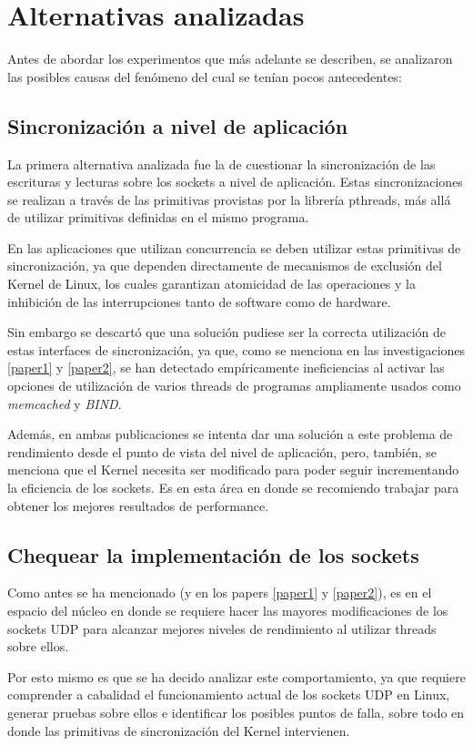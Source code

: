 \documentclass[12pt,spanish,letterpaper]{article}
\begin{document}
\section{Alternativas analizadas}
\par Antes de abordar los experimentos que más adelante se describen, se analizaron las posibles causas del fenómeno del cual se tenían pocos antecedentes:
\subsection{Sincronización a nivel de aplicación}
\par La primera alternativa analizada fue la de cuestionar la sincronización de las escrituras y lecturas sobre los sockets a nivel de aplicación. Estas sincronizaciones se realizan a través de las primitivas provistas por la librería pthreads, más allá de utilizar primitivas definidas en el mismo programa.
\par En las aplicaciones que utilizan concurrencia se deben utilizar estas primitivas de sincronización, ya que dependen directamente de mecanismos de exclusión del Kernel de Linux, los cuales garantizan atomicidad de las operaciones y la inhibición de las interrupciones tanto de software como de hardware.
\par Sin embargo se descartó que una solución pudiese ser la correcta utilización de estas interfaces de sincronización, ya que, como se menciona en las investigaciones \ref{paper1} y \ref{paper2}, se han detectado empíricamente ineficiencias al activar las opciones de utilización de varios threads de programas ampliamente usados como \emph{memcached} y \emph{BIND}.
\par Además, en ambas publicaciones se intenta dar una solución a este problema de rendimiento desde el punto de vista del nivel de aplicación, pero, también, se menciona que el Kernel necesita ser modificado para poder seguir incrementando la eficiencia de los sockets. Es en esta área en donde se recomiendo trabajar para obtener los mejores resultados de performance.
\subsection{Chequear la implementación de los sockets}
\par Como antes se ha mencionado (y en los papers \ref{paper1} y \ref{paper2}), es en el espacio del núcleo en donde se requiere hacer las mayores modificaciones de los sockets UDP para alcanzar mejores niveles de rendimiento al utilizar threads sobre ellos.
\par Por esto mismo es que se ha decido analizar este comportamiento, ya que requiere comprender a cabalidad el funcionamiento actual de los sockets UDP en Linux, generar pruebas sobre ellos e identificar los posibles puntos de falla, sobre todo en donde las primitivas de sincronización del Kernel intervienen.
\end{document}
